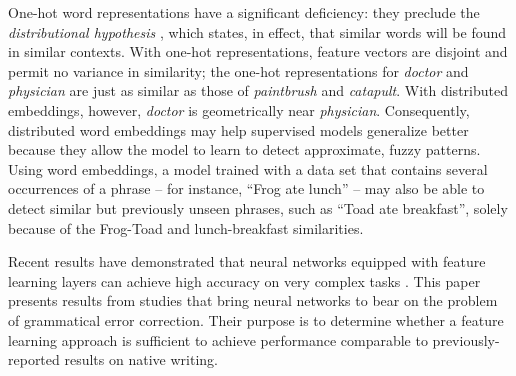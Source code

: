 One-hot word representations have a significant deficiency: they preclude the \textit{distributional hypothesis} \cite{firth1957synopsis}, which states, in effect, that similar words will be found in similar contexts.  With one-hot representations, feature vectors are disjoint and permit no variance in similarity; the one-hot representations for \textit{doctor} and \textit{physician} are just as similar as those of \textit{paintbrush} and \textit{catapult}. With distributed embeddings, however, \textit{doctor} is geometrically near \textit{physician}. Consequently, distributed word embeddings may help supervised models generalize better because they allow the model to learn to detect approximate, fuzzy patterns.  Using word embeddings, a model trained with a data set that contains several occurrences of a phrase -- for instance, ``Frog ate lunch'' -- may also be able to detect similar but previously unseen phrases, such as ``Toad ate breakfast'', solely because of the Frog-Toad and lunch-breakfast similarities.

Recent results have demonstrated that neural networks equipped with feature learning layers can achieve high accuracy on very complex tasks \cite{NIPS2012_4824,graves2013speech}.
This paper presents results from studies that bring neural networks to bear on the problem of grammatical error correction.  Their purpose is to determine whether a feature learning approach is sufficient to achieve performance comparable to previously-reported results on native writing.

